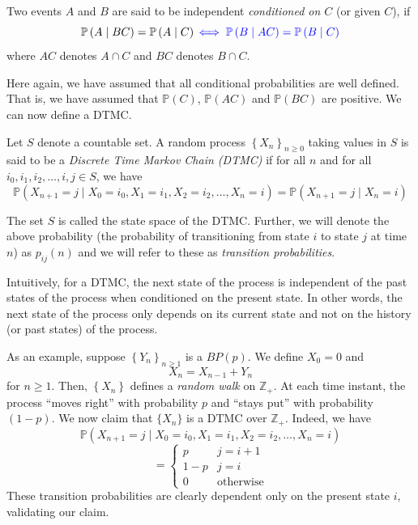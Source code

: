 \documentclass[12pt]{article}
\def\P{\mathbb{P}}
\theoremstyle{definition}
\begin{document}
\begin{defn}
    Two events $A$ and $B$ are said to be independent \emph{conditioned on $C$} (or given $C$), if 
    \[
        \P \left( A \mid BC \right) = \P \left( A \mid C \right) \textcolor{blue}{\iff \P \left( B \mid AC \right) = \P \left( B \mid C \right)}
    \]
    where $AC$ denotes $A \cap C$ and $BC$ denotes $B \cap C$.
\end{defn}
Here again, we have assumed that all conditional probabilities are well defined. That is, we have assumed that $\P(C)$, $\P(AC)$ and  $\P(BC)$ are positive. We can now define a DTMC. 

\begin{defn}
    Let $S$ denote a countable set. A random process $\left\{ X_n \right\}_{n \geq 0}$ taking values in $S$ is said to be a \emph{Discrete Time Markov Chain (DTMC)} if for all $n$ and for all $i_0, i_1, i_2, \ldots , i, j \in S$, we have
    \[
        \P \left( X_{n+1} = j \mid X_0 = i_0, X_1 = i_1, X_2 = i_2, \ldots ,X_n = i \right) = \P \left( X_{n+1} = j \mid X_n = i \right)
    \]
\end{defn}

The set $S$ is called the state space of the DTMC. Further, we will denote the above probability (the probability of transitioning from state $i$ to state $j$ at time $n$) as $p_{ij}(n)$ and we will refer to these as \emph{transition probabilities}.

\medskip

Intuitively, for a DTMC, the next state of the process is independent of the past states of the process when conditioned on the present state. In other words, the next state of the process only depends on its current state and not on the history (or past states) of the process. 

\medskip

As an example, suppose $\left\{ Y_n \right\}_{n \geq 1}$ is a $BP(p)$. We define $X_0 = 0$ and 
\[
    X_n = X_{n-1} + Y_n
\]
for $n \geq 1$. Then, $\left\{X_n\right\}$ defines a \emph{random walk} on $\mathbb{Z}_+$. At each time instant, the process ``moves right'' with probability $p$ and ``stays put'' with probability $(1-p)$. We now claim that $\{ X_n \}$ is a DTMC over $\mathbb{Z}_+$. Indeed, we have
\[
    \P \left( X_{n+1} = j \mid X_0 = i_0, X_1 = i_1, X_2 = i_2, \ldots ,X_n = i \right)
\]
\[
    = \begin{cases}
        p & j = i+1 \\
        1-p & j = i \\
        0 & \text{otherwise}
    \end{cases}
\]
These transition probabilities are clearly dependent only on the present state $i$, validating our claim.
\end{document}
